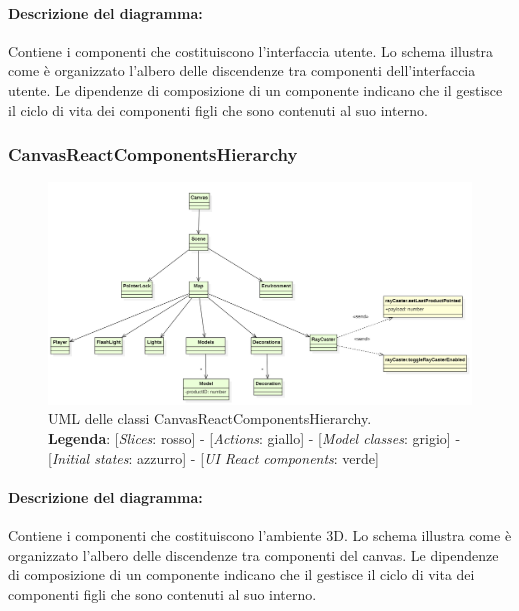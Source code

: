 \paragraph*{Descrizione del diagramma:}
Contiene i componenti che costituiscono l'interfaccia utente.
Lo schema illustra come è organizzato l'albero delle discendenze tra componenti dell'interfaccia utente.
Le dipendenze di composizione di un componente indicano che il gestisce il ciclo di vita dei componenti figli che sono contenuti 
al suo interno.

\begin{landscape}
\thispagestyle{empty}
\subsubsection{CanvasReactComponentsHierarchy}
\begin{figure}[H]
	\centering
	\includegraphics[scale=0.7 , keepaspectratio]{./res/images/CanvasReactComponentsHierarchy.PNG}
	\caption[UML delle classi CanvasReactComponentsHierarchy]{
	UML delle classi CanvasReactComponentsHierarchy.
	\\
	\textbf{Legenda}: 
	[\textit{Slices}: rosso] -
	[\textit{Actions}: giallo] -
	[\textit{Model classes}: grigio] -
	[\textit{Initial states}: azzurro] -
	[\textit{UI React components}: verde]}
\end{figure}
\end{landscape}
\restoregeometry

\paragraph*{Descrizione del diagramma:}
Contiene i componenti che costituiscono l'ambiente 3D.
Lo schema illustra come è organizzato l'albero delle discendenze tra componenti del canvas.
Le dipendenze di composizione di un componente indicano che il gestisce il ciclo di vita dei componenti figli che sono contenuti 
al suo interno.

